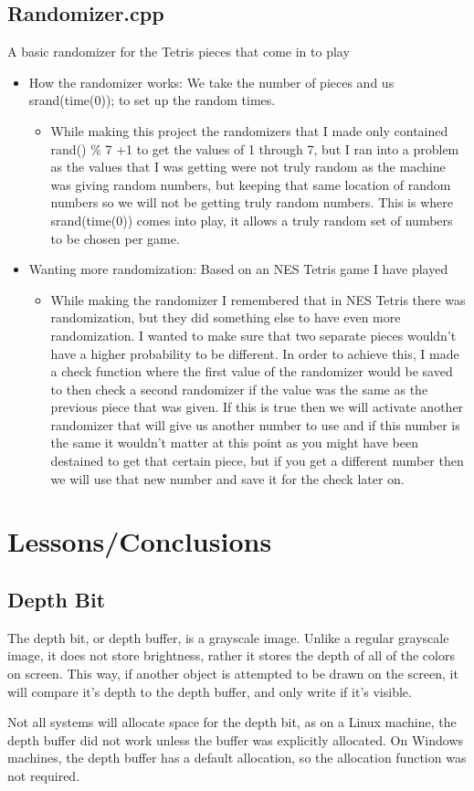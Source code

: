 \documentclass[letterpaper, 12pt]{article}
\begin{document}
\subsection{Randomizer.cpp}
A basic randomizer for the Tetris pieces that come in to play
\begin{itemize}
    \item How the randomizer works: We take the number of pieces and us srand(time(0)); to set up the random times.
        \begin{itemize}
            \item While making this project the randomizers that I made only contained rand() \% 7 +1 to get the values of 1 through 7, but I ran into a problem as the values that I was getting were not truly random as the machine was giving random numbers, but keeping that same location of random numbers so we will not be getting truly random numbers. This is where srand(time(0)) comes into play, it allows a truly random set of numbers to be chosen per game.
        \end{itemize}
    \item Wanting more randomization: Based on an NES Tetris game I have played
        \begin{itemize}
            \item While making the randomizer I remembered that in NES Tetris there was randomization, but they did something else to have even more randomization. I wanted to make sure that two separate pieces wouldn’t have a higher probability to be different. In order to achieve this, I made a check function where the first value of the randomizer would be saved to then check a second randomizer if the value was the same as the previous piece that was given. If this is true then we will activate another randomizer that will give us another number to use and if this number is the same it wouldn’t matter at this point as you might have been destained to get that certain piece, but if you get a different number then we will use that new number and save it for the check later on.
        \end{itemize}
\end{itemize}
\section{Lessons/Conclusions}
\subsection{Depth Bit}
The depth bit, or depth buffer, is a grayscale image.
Unlike a regular grayscale image, it does not store brightness, rather it stores the depth of all of the colors on screen.
This way, if another object is attempted to be drawn on the screen, it will compare it's depth to the depth buffer, and only write if it's visible.

Not all systems will allocate space for the depth bit, as on a Linux machine, the depth buffer did not work unless the buffer was explicitly allocated.
On Windows machines, the depth buffer has a default allocation, so the allocation function was not required.
\end{document}
